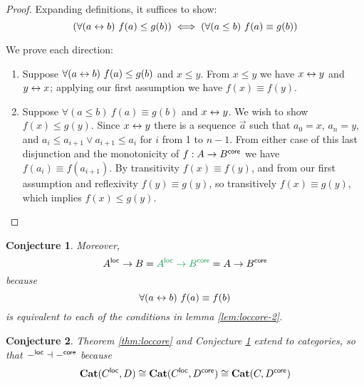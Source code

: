 \documentclass{article}
\newtheorem{conjecture}{Conjecture}
\newcommand{\mb}[1]{\ensuremath{\mathbf{#1}}}
\begin{document}
\begin{proof}
  Expanding definitions, it suffices to show:
  \[ (\forall(a \leftrightarrow b)\ f(a) \le g(b))
  \iff
  (\forall(a \le b)\ f(a) \equiv g(b))
  \]

  We prove each direction:
  \begin{enumerate}
  \item Suppose $\forall(a \leftrightarrow b)\ f(a) \le g(b)$ and $x \le y$. From $x \le y$
    we have $x \leftrightarrow y$ and $y \leftrightarrow x$; applying our first assumption we have
    $f(x) \equiv f(y)$.

  \item Suppose $\forall(a \le b)\ f(a) \equiv g(b)$ and $x \leftrightarrow y$. We wish to
    show $f(x) \le g(y)$. Since $x \leftrightarrow y$ there is a sequence $\vec{a}$ such
    that $a_0 = x$, $a_n = y$, and $a_i \le a_{i+1} \vee a_{i+1} \le a_i$ for
    $i$ from 1 to $n-1$. From either case of this last disjunction and the
    monotonicity of $f : A \to B^{\mathsf{core}}$ we have $f(a_i) \equiv f(a_{i+1})$. By
    transitivity $f(x) \equiv f(y)$, and from our first assumption and
    reflexivity $f(y) \equiv g(y)$, so transitively $f(x) \equiv g(y)$, which
    implies $f(x) \le g(y)$.
  \end{enumerate}
\end{proof}

\begin{conjecture} \label{cnj:loccore} Moreover,
  \[ A^\loc \to B = {\color{ForestGreen} A^\loc \to B^\core} = A \to B^\core \]
  because
  \[ \forall(a \leftrightarrow b)\ f(a) \equiv f(b) \]
  is equivalent to each of the conditions in lemma \ref{lem:loccore-2}.
\end{conjecture}


\begin{conjecture}
  Theorem \ref{thm:loccore} and Conjecture \ref{cnj:loccore} extend to
  categories, so that $-^{\mathsf{loc}} \dashv -^{\mathsf{core}}$ because
  \begin{equation}
    \mb{Cat}(C^\loc, D) \cong \mb{Cat}(C^\loc, D^\core) \cong \mb{Cat}(C, D^\core)
  \end{equation}
\end{conjecture}
\end{document}
